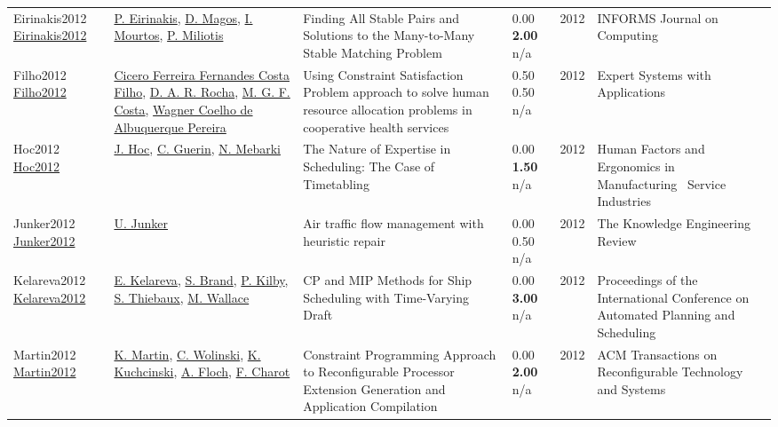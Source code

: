 {\begin{longtable}{p{3cm}p{5cm}p{10cm}p{1cm}rp{2.5cm}l}
Eirinakis2012 \href{http://dx.doi.org/10.1287/ijoc.1110.0449}{Eirinakis2012} & \hyperref[auth:a1916]{P. Eirinakis}, \hyperref[auth:a1917]{D. Magos}, \hyperref[auth:a1918]{I. Mourtos}, \hyperref[auth:a1919]{P. Miliotis} & Finding All Stable Pairs and Solutions to the Many-to-Many Stable Matching Problem & \noindent{}\textcolor{black!50}{0.00} \textbf{2.00} n/a & 2012 & \cellcolor{red!20}INFORMS Journal on Computing & \cite{Eirinakis2012}\\
Filho2012 \href{http://dx.doi.org/10.1016/j.eswa.2011.07.027}{Filho2012} & \hyperref[auth:a1949]{Cicero Ferreira Fernandes Costa Filho}, \hyperref[auth:a1950]{D. A. R. Rocha}, \hyperref[auth:a1951]{M. G. F. Costa}, \hyperref[auth:a1952]{Wagner Coelho de Albuquerque Pereira} & Using Constraint Satisfaction Problem approach to solve human resource allocation problems in cooperative health services & \noindent{}0.50 0.50 n/a & 2012 & Expert Systems with Applications & \cite{Filho2012}\\
Hoc2012 \href{http://dx.doi.org/10.1002/hfm.20359}{Hoc2012} & \hyperref[auth:a2009]{J. Hoc}, \hyperref[auth:a2010]{C. Guerin}, \hyperref[auth:a2011]{N. Mebarki} & The Nature of Expertise in Scheduling: The Case of Timetabling & \noindent{}\textcolor{black!50}{0.00} \textbf{1.50} n/a & 2012 & Human Factors and Ergonomics in Manufacturing \  Service Industries & \cite{Hoc2012}\\
Junker2012 \href{http://dx.doi.org/10.1017/s0269888912000240}{Junker2012} & \hyperref[auth:a1326]{U. Junker} & Air traffic flow management with heuristic repair & \noindent{}\textcolor{black!50}{0.00} 0.50 n/a & 2012 & The Knowledge Engineering Review & \cite{Junker2012}\\
Kelareva2012 \href{http://dx.doi.org/10.1609/icaps.v22i1.13494}{Kelareva2012} & \hyperref[auth:a332]{E. Kelareva}, \hyperref[auth:a855]{S. Brand}, \hyperref[auth:a334]{P. Kilby}, \hyperref[auth:a1518]{S. Thiebaux}, \hyperref[auth:a1519]{M. Wallace} & CP and MIP Methods for Ship Scheduling with Time-Varying Draft & \noindent{}\textcolor{black!50}{0.00} \textbf{3.00} n/a & 2012 & Proceedings of the International Conference on Automated Planning and Scheduling & \cite{Kelareva2012}\\
Martin2012 \href{http://dx.doi.org/10.1145/2209285.2209289}{Martin2012} & \hyperref[auth:a1578]{K. Martin}, \hyperref[auth:a659]{C. Wolinski}, \hyperref[auth:a660]{K. Kuchcinski}, \hyperref[auth:a1579]{A. Floch}, \hyperref[auth:a1532]{F. Charot} & Constraint Programming Approach to Reconfigurable Processor Extension Generation and Application Compilation & \noindent{}\textcolor{black!50}{0.00} \textbf{2.00} n/a & 2012 & ACM Transactions on Reconfigurable Technology and Systems & \cite{Martin2012}\\

\end{longtable}}
